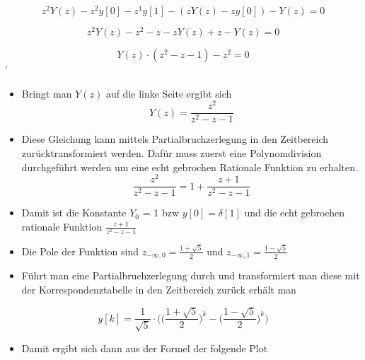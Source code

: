 \documentclass[11pt]{article}
\providecommand{\tightlist}{%
      \setlength{\itemsep}{0pt}\setlength{\parskip}{0pt}}
\begin{document}
    \[ z^2 Y(z) - z^2 y[0] - z^1 y[1] - (zY(z) - zy[0]) - Y(z) = 0 \]

    \[
    z^2 Y(z) - z^2 - z - zY(z) + z - Y(z) = 0
\]

    \[
    Y(z) \cdot (z^2 - z - 1) -z^2 = 0
\]'

    \begin{itemize}
\tightlist
\item
  Bringt man \(Y(z)\) auf die linke Seite ergibt sich \[
  Y(z) = \frac{z^2}{z^2 - z - 1}
  \]
\end{itemize}

    \begin{itemize}
\tightlist
\item
  Diese Gleichung kann mittels Partialbruchzerlegung in den Zeitbereich
  zurücktransformiert werden. Dafür muss zuerst eine Polynomdivision
  durchgeführt werden um eine echt gebrochen Rationale Funktion zu
  erhalten. \[
  \frac {z^2}{z^2 - z - 1} =  1 + \frac{z+1}{z^2 - z - 1}  
  \]
\end{itemize}

    \begin{itemize}
\tightlist
\item
  Damit ist die Konstante \(Y_0\) = 1 bzw \(y[0] = \delta[1]\) und die
  echt gebrochen rationale Funktion \(\frac{z + 1}{z^2 - z - 1}\)
\item
  Die Pole der Funktion sind \(z_{-\infty,0} = \frac{1+\sqrt{5}}{2}\)
  und \(z_{-\infty,1} = \frac{1-\sqrt{5}}{2}\)
\end{itemize}

    \begin{itemize}
\tightlist
\item
  Führt man eine Partialbruchzerlegung durch und transformiert man diese
  mit der Korrespondenztabelle in den Zeitbereich zurück erhält man
\end{itemize}

    \[ y[k] = \frac{1}{\sqrt{5}} \cdot  \bigg( \big( \frac{1+\sqrt{5}}{2} \big)^k - \big( \frac{1-\sqrt{5}}{2} \big)^k \bigg) \]

    \begin{itemize}
\tightlist
\item
  Damit ergibt sich dann aus der Formel der folgende Plot
\end{itemize}
\end{document}
